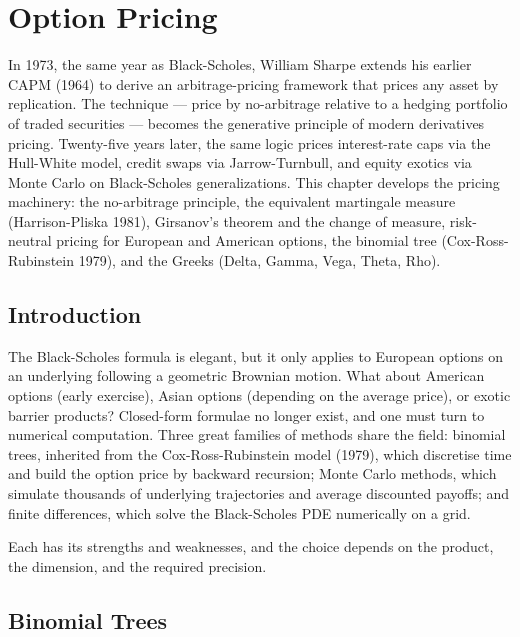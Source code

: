 \chapter{Option Pricing}
\label{ch:pricing}

In 1973, the same year as Black-Scholes, William Sharpe extends his earlier CAPM (1964) to derive an arbitrage-pricing framework that prices any asset by replication. The technique --- price by no-arbitrage relative to a hedging portfolio of traded securities --- becomes the generative principle of modern derivatives pricing. Twenty-five years later, the same logic prices interest-rate caps via the Hull-White model, credit swaps via Jarrow-Turnbull, and equity exotics via Monte Carlo on Black-Scholes generalizations. This chapter develops the pricing machinery: the no-arbitrage principle, the equivalent martingale measure (Harrison-Pliska 1981), Girsanov's theorem and the change of measure, risk-neutral pricing for European and American options, the binomial tree (Cox-Ross-Rubinstein 1979), and the Greeks (Delta, Gamma, Vega, Theta, Rho).

\section{Introduction}

The Black-Scholes formula is elegant, but it only applies to European options on an underlying following a geometric Brownian motion. What about American options (early exercise), Asian options (depending on the average price), or exotic barrier products? Closed-form formulae no longer exist, and one must turn to numerical computation. Three great families of methods share the field: binomial trees, inherited from the Cox-Ross-Rubinstein model (1979), which discretise time and build the option price by backward recursion; Monte Carlo methods, which simulate thousands of underlying trajectories and average discounted payoffs; and finite differences, which solve the Black-Scholes PDE numerically on a grid.

Each has its strengths and weaknesses, and the choice depends on the product, the dimension, and the required precision.

\section{Binomial Trees}

